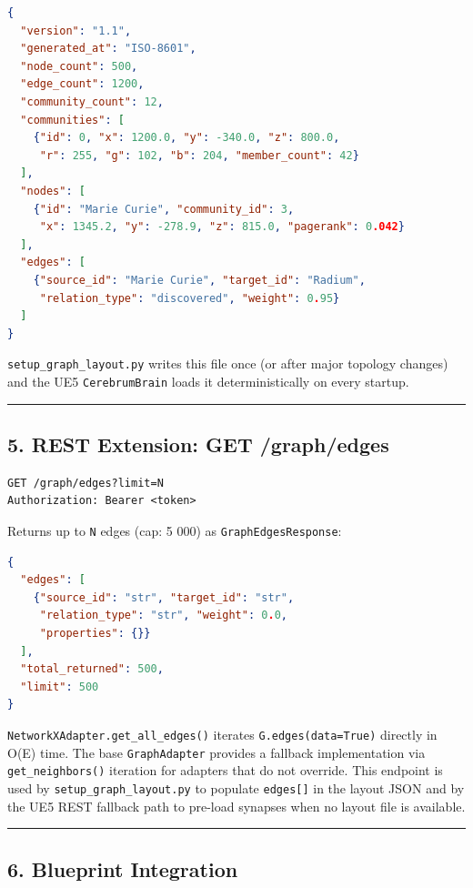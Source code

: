 \begin{lstlisting}[language=Json]
{
  "version": "1.1",
  "generated_at": "ISO-8601",
  "node_count": 500,
  "edge_count": 1200,
  "community_count": 12,
  "communities": [
    {"id": 0, "x": 1200.0, "y": -340.0, "z": 800.0,
     "r": 255, "g": 102, "b": 204, "member_count": 42}
  ],
  "nodes": [
    {"id": "Marie Curie", "community_id": 3,
     "x": 1345.2, "y": -278.9, "z": 815.0, "pagerank": 0.042}
  ],
  "edges": [
    {"source_id": "Marie Curie", "target_id": "Radium",
     "relation_type": "discovered", "weight": 0.95}
  ]
}
\end{lstlisting}

\texttt{setup\_graph\_layout.py} writes this file once (or after major topology changes) and the UE5 \texttt{CerebrumBrain} loads it deterministically on every startup.

\medskip\noindent\rule{\linewidth}{0.4pt}\medskip

\subsection*{5. REST Extension: GET /graph/edges}

\begin{lstlisting}
GET /graph/edges?limit=N
Authorization: Bearer <token>
\end{lstlisting}

Returns up to \texttt{N} edges (cap: 5 000) as \texttt{GraphEdgesResponse}:

\begin{lstlisting}[language=Json]
{
  "edges": [
    {"source_id": "str", "target_id": "str",
     "relation_type": "str", "weight": 0.0,
     "properties": {}}
  ],
  "total_returned": 500,
  "limit": 500
}
\end{lstlisting}

\texttt{NetworkXAdapter.get\_all\_edges()} iterates \texttt{G.edges(data=True)} directly in O(E) time. The base \texttt{GraphAdapter} provides a fallback implementation via \texttt{get\_neighbors()} iteration for adapters that do not override. This endpoint is used by \texttt{setup\_graph\_layout.py} to populate \texttt{edges[]} in the layout JSON and by the UE5 REST fallback path to pre-load synapses when no layout file is available.

\medskip\noindent\rule{\linewidth}{0.4pt}\medskip

\subsection*{6. Blueprint Integration}

